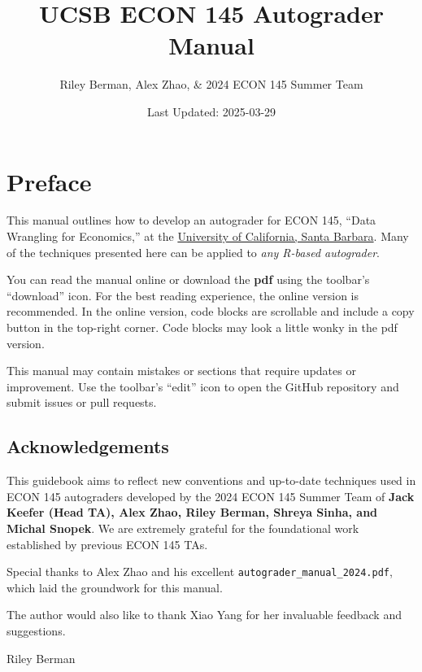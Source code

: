 \documentclass[
  12pt,
]{book}
\title{UCSB ECON 145 Autograder Manual}
\author{Riley Berman, Alex Zhao, \& 2024 ECON 145 Summer Team}
\date{Last Updated: 2025-03-29}
\begin{document}
\maketitle

{
\hypersetup{linkcolor=}
\setcounter{tocdepth}{1}
\tableofcontents
}
\chapter*{Preface}\label{preface}

This manual outlines how to develop an autograder for ECON 145, ``Data Wrangling for Economics,'' at the \href{https://econ.ucsb.edu/programs/undergraduate/courses}{University of California, Santa Barbara}. Many of the techniques presented here can be applied to \emph{any R-based autograder}.

You can read the manual online or download the \textbf{pdf} using the toolbar's ``download'' icon. For the best reading experience, the online version is recommended. In the online version, code blocks are scrollable and include a copy button in the top-right corner. Code blocks may look a little wonky in the pdf version.

This manual may contain mistakes or sections that require updates or improvement. Use the toolbar's ``edit'' icon to open the GitHub repository and submit issues or pull requests.

\section*{Acknowledgements}\label{Acknowledgements}

This guidebook aims to reflect new conventions and up-to-date techniques used in ECON 145 autograders developed by the 2024 ECON 145 Summer Team of \textbf{Jack Keefer (Head TA), Alex Zhao, Riley Berman, Shreya Sinha, and Michal Snopek}. We are extremely grateful for the foundational work established by previous ECON 145 TAs.

Special thanks to Alex Zhao and his excellent \texttt{autograder\_manual\_2024.pdf}, which laid the groundwork for this manual.

The author would also like to thank Xiao Yang for her invaluable feedback and suggestions.

\begin{flushright}
Riley Berman
\end{flushright}
\end{document}
